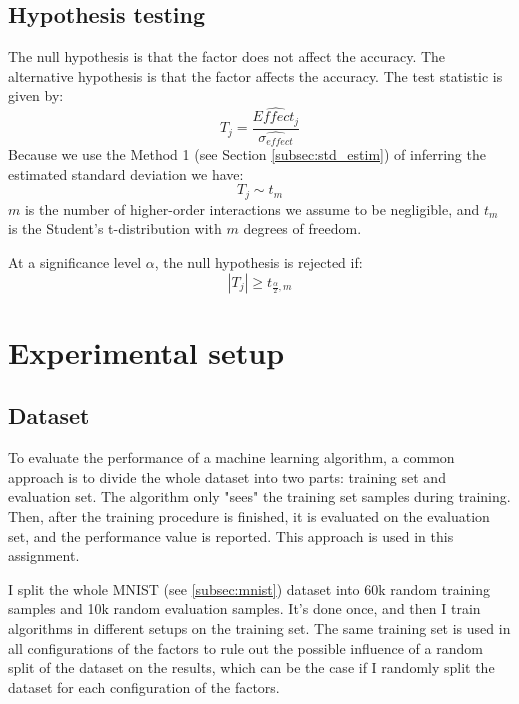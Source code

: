 \documentclass{article}
\begin{document}
\subsection{Hypothesis testing}
\label{subsec:hypothesis_testing}

The null hypothesis is that the factor does not affect the accuracy. The alternative hypothesis is that the factor affects the accuracy. The test statistic is given by:
\begin{equation}
    T_j = \frac{\widehat{Effect_j}}{\widehat{\sigma_{effect}}}
\end{equation}
Because we use the Method 1 (see Section \ref{subsec:std_estim}) of inferring the estimated standard deviation we have:
\begin{equation}
    T_j \sim t_{m}
\end{equation}
$m$ is the number of higher-order interactions we assume to be negligible, and $t_{m}$ is the Student's t-distribution with $m$ degrees of freedom.

At a significance level $\alpha$, the null hypothesis is rejected if:
\begin{equation}
    |T_j| \geq t_{\frac{\alpha}{2}, m}
\end{equation}

\section{Experimental setup}

\subsection{Dataset}
\label{subsec:dataset}
To evaluate the performance of a machine learning algorithm, a common approach is to divide the whole dataset into two parts: training set and evaluation set. The algorithm only "sees" the training set samples during training. Then, after the training procedure is finished, it is evaluated on the evaluation set, and the performance value is reported. This approach is used in this assignment.

I split the whole MNIST (see \ref{subsec:mnist}) dataset into 60k random training samples and 10k random evaluation samples. It's done once, and then I train algorithms in different setups on the training set. The same training set is used in all configurations of the factors to rule out the possible influence of a random split of the dataset on the results, which can be the case if I randomly split the dataset for each configuration of the factors.
\end{document}
